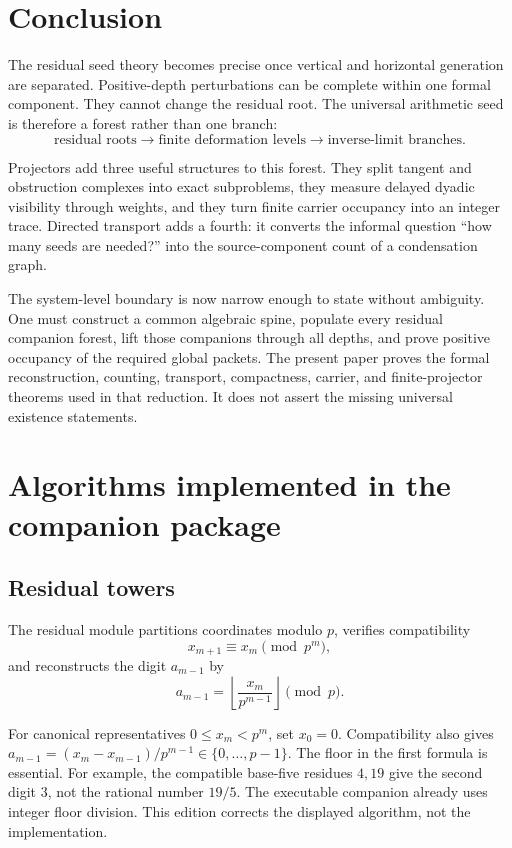 \documentclass[11pt]{article}
\theoremstyle{definition}
\theoremstyle{remark}
\begin{document}
\section{Conclusion}

The residual seed theory becomes precise once vertical and horizontal generation are separated.  Positive-depth perturbations can be complete within one formal component.  They cannot change the residual root.  The universal arithmetic seed is therefore a forest rather than one branch:
\[
\boxed{
\text{residual roots}
\longrightarrow
\text{finite deformation levels}
\longrightarrow
\text{inverse-limit branches}.
}
\]

Projectors add three useful structures to this forest.  They split tangent and obstruction complexes into exact subproblems, they measure delayed dyadic visibility through weights, and they turn finite carrier occupancy into an integer trace.  Directed transport adds a fourth: it converts the informal question ``how many seeds are needed?'' into the source-component count of a condensation graph.

The system-level boundary is now narrow enough to state without ambiguity.  One must construct a common algebraic spine, populate every residual companion forest, lift those companions through all depths, and prove positive occupancy of the required global packets.  The present paper proves the formal reconstruction, counting, transport, compactness, carrier, and finite-projector theorems used in that reduction.  It does not assert the missing universal existence statements.

\appendix

\section{Algorithms implemented in the companion package}

\subsection{Residual towers}

The residual module partitions coordinates modulo \(p\), verifies compatibility
\[
x_{m+1}\equiv x_m\pmod{p^m},
\]
and reconstructs the digit \(a_{m-1}\) by
\[
a_{m-1}=\left\lfloor\frac{x_m}{p^{m-1}}\right\rfloor\pmod p.
\]

For canonical representatives $0\le x_m<p^m$, set $x_0=0$. Compatibility also gives
$a_{m-1}=(x_m-x_{m-1})/p^{m-1}\in\{0,\ldots,p-1\}$.
The floor in the first formula is essential. For example, the compatible
base-five residues $4,19$ give the second digit $3$, not the rational number $19/5$.
The executable companion already uses integer floor division. This edition
corrects the displayed algorithm, not the implementation.
\end{document}
